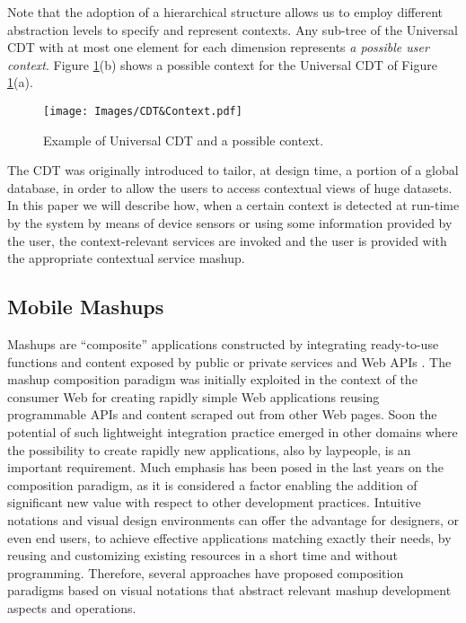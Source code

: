 Note that the adoption of a hierarchical
structure allows us to employ different abstraction levels to specify and represent contexts. Any sub-tree of the Universal CDT with at most one element for each dimension represents \emph{a possible user context}.
Figure \ref{fig:UCDT}(b)  shows a possible context for the Universal CDT of Figure \ref{fig:UCDT}(a).

%
\begin{figure} [t]
\centering
\texttt{[image: Images/CDT\&Context.pdf]}
\caption{Example of Universal CDT and a possible context.}
\label{fig:UCDT}
\end{figure}
%


The CDT was originally introduced to tailor, at design time, a portion of a global database, in order to allow the users to access contextual views of huge datasets.
In this paper we will describe how, when a certain context %
is detected at run-time by the system
by means of  device sensors or using some information provided by the user,  the context-relevant services are invoked and the user is provided with the appropriate contextual service mashup.

\subsection{Mobile Mashups}
Mashups  are ``composite'' applications constructed by integrating ready-to-use functions and content exposed by public or private services and Web APIs \cite{DBLP:books/sp/DanielM14}. The mashup composition paradigm was initially exploited in the context of the consumer Web for creating rapidly simple Web applications reusing programmable APIs and content scraped out from other Web pages. %
Soon the potential of such lightweight integration practice emerged in other domains where the possibility to create rapidly new applications, also by laypeople, is an important requirement. Much emphasis has been posed in the last years on the composition paradigm, as it is considered a factor enabling the addition of significant new value with respect to other development practices. Intuitive notations and visual design environments can offer the advantage for designers, or even end users, to achieve effective applications matching exactly their needs, by reusing and customizing existing resources in a short time and without programming. Therefore, several approaches have proposed composition paradigms based on visual notations that abstract relevant mashup development aspects and operations.

